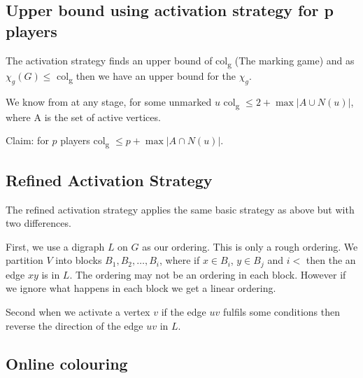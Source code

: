 \subsection{Upper bound using activation strategy for p players}

The activation strategy finds an upper bound of col\textsubscript{g} (The marking game) and as $\chi_g(G) \leq$ col\textsubscript{g} then we have an upper bound for the $\chi_g$. 

We know from \cite{Zhu2008} at any stage, for some unmarked $u$ col\textsubscript{g} $\leq 2 + \max{\left| A \cup N(u)\right| }$, where A is the set of active vertices.

Claim: for $p$ players col\textsubscript{g} $\leq p + \max{ \left| A \cap N(u)\right| }$. 

\subsection{Refined Activation Strategy}
The refined activation strategy applies the same basic strategy as above but with two differences. 

First, we use a digraph $L$ on $G$ as our ordering. This is only a rough ordering. We partition $V$ into blocks $B_1,B_2,\dots,B_i$, where if $x \in B_i$, $y \in B_j$ and $i <$ then the an edge $xy$ is in $L$. The ordering may not be an ordering in each block. However if we ignore what happens in each block we get a linear ordering.

Second when we activate a vertex $v$ if the edge $uv$ fulfils some conditions then reverse the direction of the edge $uv$ in $L$.

\subsection{Online colouring}

        


















